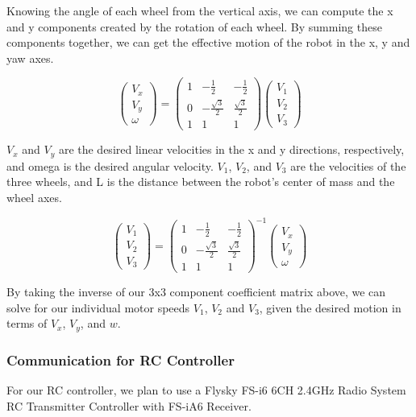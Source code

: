 \documentclass[journal,onecolumn, draftclsnofoot, 12pt]{IEEEtran}
\begin{document}
Knowing the angle of each wheel from the vertical axis, we can compute the x and y components created by the rotation of each wheel. By summing these components together, we can get the effective motion of the robot in the x, y and yaw axes.

\[
\begin{pmatrix}
V_x \\
V_y \\
\omega
\end{pmatrix}
=
\begin{pmatrix}
1 & - \frac{1}{2} & -\frac{1}{2} \\
0 & -\frac{\sqrt{3}}{2} & \frac{\sqrt{3}}{2} \\
1 & 1 & 1
\end{pmatrix}
\begin{pmatrix}
V_1 \\
V_2 \\
V_3
\end{pmatrix}
\]
    
$V_{x}$ and $V_{y}$ are the desired linear velocities in the x and y directions, respectively, and omega is the desired angular velocity. $V_{1}$, $V_{2}$, and $V_{3}$ are the velocities of the three wheels, and L is the distance between the robot's center of mass and the wheel axes.

\[
\begin{pmatrix}
V_1 \\
V_2 \\
V_3
\end{pmatrix}
=
\begin{pmatrix}
1 & - \frac{1}{2} & -\frac{1}{2} \\
0 & -\frac{\sqrt{3}}{2} & \frac{\sqrt{3}}{2} \\
1 & 1 & 1
\end{pmatrix}^{-1}
\begin{pmatrix}
V_x \\
V_y \\
\omega
\end{pmatrix}
\]

By taking the inverse of our 3x3 component coefficient matrix above, we can solve for our individual motor speeds $V_1$, $V_2$ and $V_3$, given the desired motion in terms of $V_x$, $V_y$, and $w$.


\subsubsection{Communication for RC Controller}
\label{sec:RCController}
For our RC controller, we plan to use a Flysky FS-i6 6CH 2.4GHz Radio System RC Transmitter Controller with FS-iA6 Receiver. 
\end{document}
